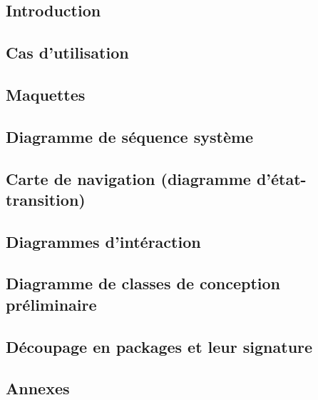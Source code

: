 \documentclass[asi]{picInsa}
\title{\DCP{}}
\author{\Florian{}, \Kafui{}, \Melissa{}, \Julie{}, \Mathieu{}} %
\begin{document}
\couverture{}

 \informationsGenerales{}


\tableofcontents

\setcounter{chapter}{0}


\chapter*{Introduction}
\label{intro}


\chapter{Cas d'utilisation}
\label{casUtilisation}


\chapter{Maquettes}
\label{maquettes}


\chapter{Diagramme de séquence système}
\label{diagrammeSequenceSysteme}


\chapter{Carte de navigation (diagramme d'état-transition)}
\label{diagrammeNavigation}


\chapter{Diagrammes d'intéraction}
\label{diagrammeInteraction}


\chapter{Diagramme de classes de conception préliminaire}
\label{diagrammeClasses}


\chapter{Découpage en packages et leur signature}
\label{diagrammePackages}


\begin{appendix}
\part*{Annexes}
\label{dico_donnees}


\listoffigures
{}
	 
\listoftables
{}
\end{appendix}
\pageQuatriemeCouverture
\end{document}
